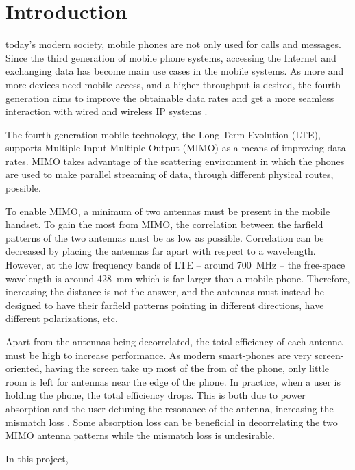 \section{Introduction}
\label{sec:introduction}

 today's modern society, mobile phones are not only used for calls and messages. Since the third generation of mobile phone systems, accessing the Internet and exchanging data has become main use cases in the mobile systems. As more and more devices need mobile access, and a higher throughput is desired, the fourth generation aims to improve the obtainable data rates and get a more seamless interaction with wired and wireless IP systems \cite{tanenbaum2012computer}.

The fourth generation mobile technology, the Long Term Evolution (LTE),  supports Multiple Input Multiple Output (MIMO) as a means of improving data rates. MIMO takes advantage of the scattering environment in which the phones are used to make parallel streaming of data, through different physical routes, possible.


To enable MIMO, a minimum of two antennas must be present in the mobile handset. To gain the most from MIMO, the correlation between the farfield patterns of the two antennas must be as low as possible. Correlation can be decreased by placing the antennas far apart with respect to a wavelength. However, at the low frequency bands of LTE -- around \SI{700}{MHz} -- the free-space wavelength is around \SI{428}{mm} which is far larger than a mobile phone. Therefore, increasing the distance is not the answer, and the antennas must instead be designed to have their farfield patterns pointing in different directions, have different polarizations, etc.


Apart from the antennas being decorrelated, the total efficiency of each antenna must be high to increase performance. As modern smart-phones are very screen-oriented, having the screen take up most of the from of the phone, only little room is left for antennas near the edge of the phone. In practice, when a user is holding the phone, the total efficiency drops. This is both due to power absorption and the user detuning the resonance of the antenna, increasing the mismatch loss \cite{Samantha2014UserEff}. Some absorption loss can be beneficial in decorrelating the two MIMO antenna patterns \cite{Samantha2014UserEff} while the mismatch loss is undesirable.




In this project,
